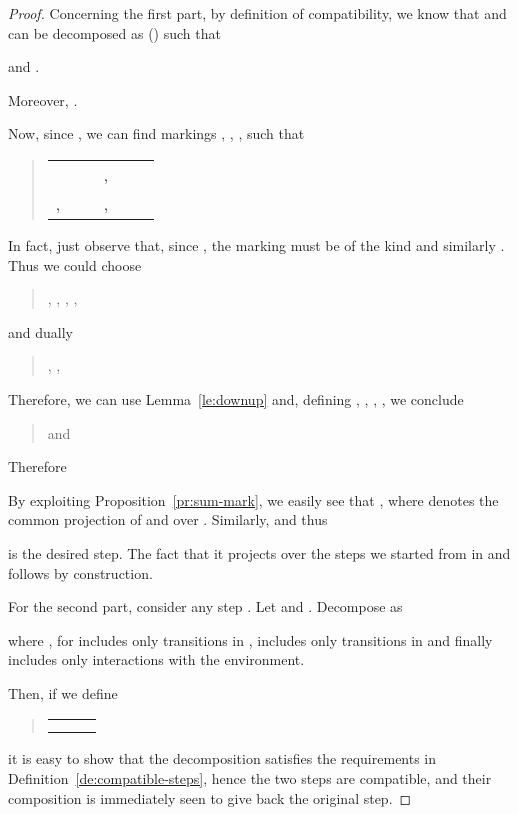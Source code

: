 \documentclass{LMCS}
\begin{document}
\begin{proof}
  Concerning the first part, by definition of compatibility, we know
  that  and  can be decomposed as 
  () such that
  \begin{center}
     \quad and \quad
    .
  \end{center}
  Moreover, .

  Now, since , we can find markings 
  , , ,  such that
  \begin{quote}
    \begin{tabular}{lll}
       \ \ \ \ &  , \ \ & \\
    , & , & 
  \end{tabular}
\end{quote}
  In fact, just observe that, since , the marking 
  must be of the kind  and 
  similarly .
Thus
  we could choose 
  \begin{quote}
    , \quad ,  \quad
    , \quad ,
  \end{quote}
  and dually
  \begin{quote}
    , \quad  \quad
    , \quad 
  \end{quote}
  Therefore, we can use Lemma~\ref{le:downup} and, defining
  , ,
  , ,
  we conclude
  \begin{quote}
     and 
     
  \end{quote}
  Therefore
  \begin{quote}
    
  \end{quote}

  By exploiting Proposition~\ref{pr:sum-mark}, we easily see that
  , where  denotes
  the common projection of  and  over . Similarly,
   and thus
  \begin{quote}
    
  \end{quote}
  is the desired step. The fact that it projects over the steps we started
  from in  and  follows by construction.

  \bigskip 

  For the second part, consider any step . Let
   and .
  Decompose  as
  \begin{quote}
    
  \end{quote}
  where , for  includes only transitions in
  ,  includes only transitions in
   and finally  includes only
  interactions with the environment.

  Then, if we define
  \begin{quote}
    \begin{tabular}{lll}
       & \hspace{10mm} & \\
       & \quad & 
    \end{tabular}
  \end{quote}
  it is easy to show that the decomposition satisfies the requirements
  in Definition~\ref{de:compatible-steps}, hence the two steps are
  compatible, and their composition is immediately seen to give back
  the original step.
\end{proof}
\end{document}
